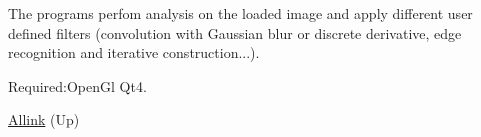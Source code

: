 \-The programs perfom analysis on the loaded image and apply different user defined filters (convolution with \-Gaussian blur or discrete derivative, edge recognition and iterative construction...).\par
 \-Required\-:\-Open\-Gl \-Qt4.


\begin{DoxyItemize}
\item \hyperlink{index}{\-Allink} (\-Up)  
\end{DoxyItemize}